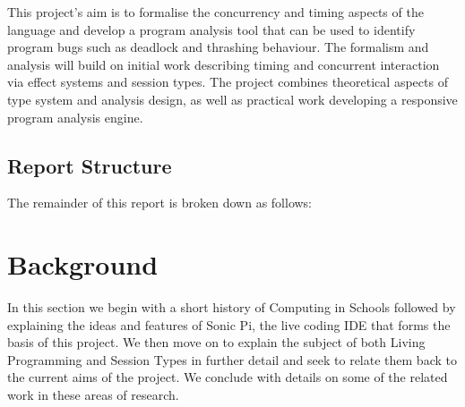 \documentclass[11pt]{scrartcl}
\begin{document}
This project's aim is to formalise the concurrency and timing aspects of the 
language and develop a program analysis tool that can be used to identify 
program bugs such as deadlock and thrashing behaviour. The formalism and 
analysis will build on initial work describing timing and concurrent 
interaction via effect systems and session types. The project combines 
theoretical aspects of type system and analysis design, as well as practical 
work developing a responsive program analysis engine.

\subsection{Report Structure}
The remainder of this report is broken down as follows:

\begin{itemize}

\end{itemize}
\newpage

\section{Background}
In this section we begin with a short history of Computing in Schools followed 
by explaining the ideas and features of Sonic Pi, the live coding IDE that forms 
the basis of this project. We then move on to explain the subject of both Living 
Programming and Session Types in further detail and seek to relate them back to 
the current aims of the project. We conclude with details on some of the related 
work in these areas of research.
\end{document}
